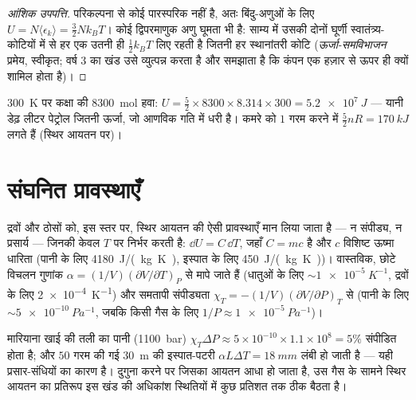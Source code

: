\begin{proof}[आंशिक उपपत्ति]
परिकल्पना से कोई पारस्परिक  नहीं है, अतः बिंदु-अणुओं के लिए $U = N\langle\epsilon_k\rangle
= \tfrac32 Nk_BT$। कोई द्विपरमाणुक अणु घूमता भी है: साम्य में उसकी दोनों
घूर्णी स्वातंत्र्य-कोटियों में से हर एक उतनी ही $\tfrac12 k_BT$ लिए रहती
है जितनी हर स्थानांतरी कोटि (\emph{ऊर्जा-समविभाजन} प्रमेय, स्वीकृत; वर्ष 3
का खंड उसे व्युत्पन्न करता है और समझाता है कि कंपन एक हज़ार  से ऊपर
ही क्यों शामिल होता है)।
\end{proof}

\begin{example}[एक कमरे भर की ऊर्जा]\label{ex:b1:kinetic-theory:room}
\qty{300}{K} पर कक्षा की \qty{8300}{mol} हवा: $U = \tfrac52 \times
8300 \times 8.314 \times 300 = \qty{5.2e7}{J}$ --- यानी डेढ़ लीटर पेट्रोल
जितनी ऊर्जा, जो आणविक गति में धरी है। कमरे को $1$  गरम करने में
$\tfrac52 nR = \qty{170}{kJ}$ लगते हैं (स्थिर आयतन पर)।
\end{example}

\section{संघनित प्रावस्थाएँ}

\begin{proposition}[असंपीड्य, अप्रसार्य प्रावस्था का प्रतिरूप]\label{prop:b1:kinetic-theory:condensed}
द्रवों और ठोसों को, इस स्तर पर, स्थिर आयतन की ऐसी प्रावस्थाएँ मान लिया
जाता है --- न संपीड्य, न प्रसार्य --- जिनकी  केवल $T$ पर
निर्भर करती है: $\dd U = C\,\dd T$, जहाँ $C = mc$ है और $c$ विशिष्ट ऊष्मा
धारिता (पानी के लिए \qty{4180}{J/(kg.K)}, इस्पात के लिए
\qty{450}{J/(kg.K)})। वास्तविक, छोटे विचलन  गुणांक
$\alpha = (1/V)(\partial V/\partial T)_P$ से मापे जाते हैं (धातुओं के लिए
$\sim\qty{1e-5}{K^{-1}}$, द्रवों के लिए \qty{2e-4}{K^{-1}}) और समतापी
संपीड्यता $\chi_T = -(1/V)(\partial V/\partial P)_T$ से (पानी के लिए
$\sim\qty{5e-10}{Pa^{-1}}$, जबकि किसी गैस के लिए $1/P \approx \qty{1e-5}{Pa^{-1}}$)।
\end{proposition}
\admitted

\begin{example}[कितनी असंपीड्य]\label{ex:b1:kinetic-theory:water}
मारियाना खाई की तली का पानी (\qty{1100}{bar})
$\chi_T\Delta P \approx 5\times10^{-10} \times 1.1\times10^8 = 5\%$ संपीडित
होता है; और $50$  गरम की गई \qty{30}{m} की इस्पात-पटरी $\alpha L\Delta T =
\qty{18}{mm}$ लंबी हो जाती है --- यही प्रसार-संधियों का कारण है।  दुगुना
करने पर जिसका आयतन आधा हो जाता है, उस गैस के सामने स्थिर आयतन का प्रतिरूप
इस खंड की अधिकांश स्थितियों में कुछ प्रतिशत तक ठीक बैठता है।
\end{example}

